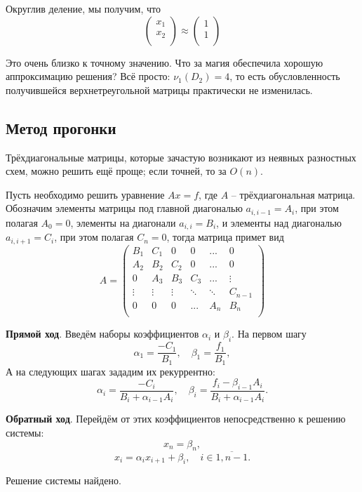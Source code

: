 \documentclass{article}
\begin{document}
\begin{example}
	Округлив деление, мы получим, что
	\[
		\begin{pmatrix}
			x_1 \\
			x_2 \\
		\end{pmatrix}
		\approx
		\begin{pmatrix}
			1 \\
			1 \\
		\end{pmatrix}
	\]

	Это очень близко к точному значению. Что за магия обеспечила хорошую
	аппроксимацию решения? Всё просто: $\nu_1(D_2)=4$, то есть
	обусловленность получившейся верхнетреугольной матрицы практически не
	изменилась.
\end{example}
\leavevmode

\subsection{Метод прогонки}
Трёхдиагональные матрицы, которые зачастую возникают из неявных разностных схем,
можно решить ещё проще; если точней, то за $O(n)$.

\begin{algorithm}
	Пусть необходимо решить уравнение $Ax=f$, где $A$ -- трёхдиагональная
	матрица. Обозначим элементы матрицы
	под главной диагональю $a_{i,i-1}=A_i$, при этом полагая $A_0=0$,
	элементы на диагонали $a_{i,i}=B_i$,
	и элементы над диагональю $a_{i,i+1}=C_i$, при этом полагая $C_n=0$,
	тогда матрица примет вид
	\[
		A=
		\begin{pmatrix}
			B_1	& C_1	& 0	& 0	& ...	& 0 \\
			A_2	& B_2	& C_2	& 0	& ...	& 0 \\
			0	& A_3	& B_3	& C_3	& ...	& \vdots\\
			\vdots	& \vdots& \vdots& \ddots& \ddots& C_{n-1} \\
			0	& 0	& 0	& ...	& A_n	& B_n\\
		\end{pmatrix}
	\]

	\textbf{Прямой ход}.
	Введём наборы коэффициентов $\alpha_i$ и $\beta_i$. На первом шагу
	\[\alpha_1=\frac{-C_1}{B_1},\quad \beta_1=\frac{f_1}{B_1},\]
	А на следующих шагах зададим их рекуррентно:
	\[\alpha_i=\frac{-C_i}{B_i+\alpha_{i-1}A_i},\quad
	\beta_i=\frac{f_i-\beta_{i-1}A_i}{B_i+\alpha_{i-1}A_i}.\]

	\textbf{Обратный ход}.
	Перейдём от этих коэффициентов непосредственно к решению системы:
	\[x_n=\beta_n,\]
	\[x_i=\alpha_i x_{i+1}+\beta_i,\quad i\in\overline{1,n-1}.\]

	Решение системы найдено.
\end{algorithm}
\end{document}
